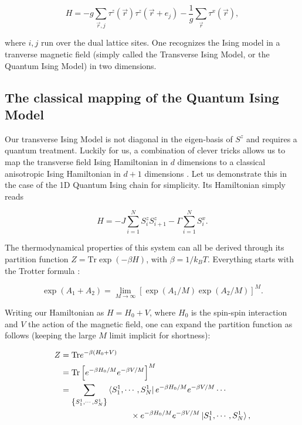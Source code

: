 \documentclass[11pt,openany]{article}
\begin{document}
\begin{equation}
	H = -g\sum_{\vec{r},j}\tau^z(\vec{r})\tau^z(\vec{r}+e_j) - \frac{1}{g}\sum_{\vec{r}}\tau^x(\vec{r}),
\end{equation}

where $i,j$ run over the dual lattice sites. One recognizes the Ising model in a tranverse magnetic field (simply called the Transverse Ising Model, or the Quantum Ising Model) in two dimensions.


\subsection{The classical mapping of the Quantum Ising Model}

Our transverse Ising Model is not diagonal in the eigen-basis of $S^z$ and requires a quantum treatment. Luckily for us, a combination of clever tricks allows us to map the transverse field Ising Hamiltonian in $d$ dimensions to a classical anisotropic Ising Hamiltonian in $d+1$ dimensions \cite{Chakrabarti}. Let us demonstrate this in the case of the 1D Quantum Ising chain  for simplicity. Its Hamiltonian simply reads

\begin{equation}
	H = -J\sum_{i=1}^N S_i^zS_{i+1}^z - \Gamma\sum_{i=1}^N S_i^x.
\end{equation}

The thermodynamical properties of this system can all be derived through its partition function $Z = \mathrm{Tr}\exp(-\beta H)$, with $\beta=1/k_BT$. Everything starts with the Trotter formula \cite{trotter}:

\begin{equation}
	\exp\left(A_1+A_2\right) =  \lim_{M\to\infty}\left[\exp\left(A_1/M\right)\exp\left(A_2/M\right)\right]^M.
\end{equation}

Writing our Hamiltonian as $H = H_0 + V$, where $H_0$ is the spin-spin interaction and $V$ the action of the magnetic field, one can expand the partition function as follows (keeping the large $M$ limit implicit for shortness):

\begin{align*}
	Z &= \mathrm{Tr}e^{-\beta\left(H_0+V\right)}\\
	&= \mathrm{Tr}\left[e^{-\beta H_0/M}e^{-\beta V/M}\right]^M\\
	&= \sum_{\left\{S^1_1,\cdots,S^1_N\right\}}\bra{S^1_1,\cdots,S^1_N}e^{-\beta H_0/M}e^{-\beta V/M}\cdots\\
	&\hspace{3cm}\times e^{-\beta H_0/M}e^{-\beta V/M}\ket{S^1_1,\cdots,S^1_N},
\end{align*}
\end{document}
